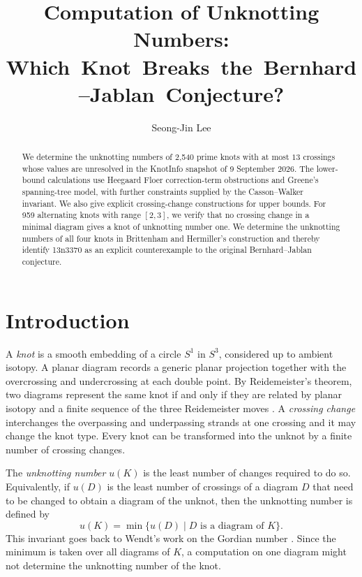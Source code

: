 \documentclass[12pt, oneside]{amsart}
\newcommand{\KI}{\textsf{KnotInfo}}
\newcommand{\kn}[2]{\textup{#1#2}}
\newcommand{\nDichotomy}{959}
\newcommand{\nLatestUnresolvedExact}{2{,}540}
\begin{document}
\title[Computation of Unknotting Numbers]{Computation of Unknotting Numbers:\\
  \mbox{Which Knot Breaks the Bernhard--Jablan Conjecture?}}
\author[Seong-Jin Lee]{Seong-Jin Lee}


\begin{abstract}
We determine the unknotting numbers of \nLatestUnresolvedExact{} prime knots
with at most $13$ crossings whose values are unresolved in the \KI{} snapshot
of 9 September 2026. The lower-bound calculations use Heegaard Floer
correction-term obstructions and Greene's spanning-tree model, with further
constraints supplied by the Casson--Walker invariant. We also give explicit
crossing-change constructions for upper bounds. For \nDichotomy{} alternating knots with range $[2,3]$, we verify
that no crossing change in a minimal diagram gives a knot of unknotting number
one. We determine the unknotting numbers of
all four knots in Brittenham and Hermiller's construction and thereby identify
\kn{13n}{3370} as an explicit counterexample to the original Bernhard--Jablan
conjecture.
\end{abstract}

\maketitle

\section{Introduction}\label{sec:intro}

A \emph{knot} is a smooth embedding of a circle $S^1$ in $S^3$, considered up to
ambient isotopy. A planar diagram records a generic planar projection together with the
overcrossing and undercrossing at each double point. By Reidemeister's theorem,
two diagrams represent the same knot if and only if they are related by planar
isotopy and a finite sequence of the three Reidemeister moves
\cite{LackenbySurvey}.
A \emph{crossing change} interchanges the overpassing and underpassing strands at
one crossing and it may change the knot type. Every knot can be transformed into the unknot by a finite number of crossing changes. 

The \emph{unknotting number} $u(K)$ is the least number of changes required to do so. Equivalently, if $u(D)$ is the least number
of crossings of a diagram $D$ that need to be changed to obtain a diagram of the unknot, then the unknotting number is defined by
\[
    u(K)=\min\{u(D)\mid D\text{ is a diagram of }K\}.
\]
This invariant goes back to Wendt's work on the Gordian number \cite{Wendt}. Since the minimum
is taken over all diagrams of $K$, a computation on one diagram might not determine
the unknotting number of the knot.
\end{document}
